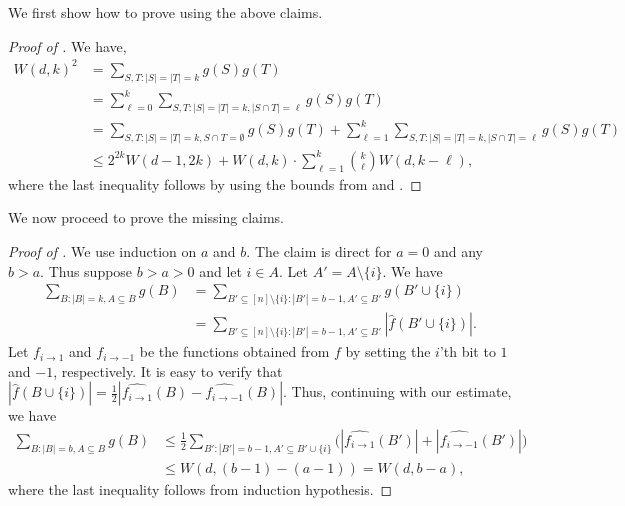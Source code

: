 \documentclass{toc}
\begin{document}
We first show how to prove  using the above claims.
\begin{proof}[Proof of ]
We have,
\begin{align*}
W(d,k)^2 &= \sum_{S,T: |S|=|T|=k} g(S) g(T) \\
 &= \sum_{\ell =0}^{k} \sum_{S, T: |S|= |T|=k, |S \cap T|=\ell} g(S) g(T) \\
 &= \sum_{S,T: |S|= |T|=k, S \cap T = \emptyset} g(S) g(T) + \sum_{\ell =1}^{k} \sum_{S, T: |S|= |T|=k, |S \cap T|=\ell} g(S) g(T) \\
 &\le 2^{2k}W(d-1,2k) + W(d,k) \cdot \sum_{\ell=1}^{k} \binom{k}{\ell}  W(d, k -\ell),
\end{align*} where the last inequality follows by using the bounds from  and .
\end{proof}
We now proceed to prove the missing claims.
\begin{proof}[Proof of ] We use induction on $a$ and $b$. The claim is direct for $a =0$  and any $b > a$. Thus suppose $b>a>0$ and let $ i\in A$. Let $A' = A \setminus \{ i\}$. We have
\begin{align*}
\sum_{B:|B|=k, A \subseteq B} g(B) &=  \sum_{B' \subseteq [n] \setminus \{ i\}:|B'|=b-1, A' \subseteq B' } g(B' \cup \{ i\}) \\
& = \sum_{B' \subseteq [n] \setminus \{ i\}:|B'|=b-1, A' \subseteq B' } |\widehat{f}(B' \cup \{ i\})|.
\end{align*}
Let $f_{i\rightarrow1}$ and $f_{i\rightarrow-1}$ be the functions obtained from $f$ by setting the $i$'th bit to $1$ and $-1$, respectively. It is easy to verify that $|\widehat{f}(B \cup \{ i\})| = \frac{1}{2}|\widehat{f_{i\rightarrow1}}(B) - \widehat{f_{i\rightarrow-1}}(B)|$. Thus, continuing with our estimate, we have
\begin{align*}
\sum_{B:|B|=b, A \subseteq B} g(B)  &\le \frac{1}{2}\sum_{B':|B'|=b-1, A' \subseteq B' \cup \{ i\} } \big(|\widehat{f_{i\rightarrow1}}(B')| + |\widehat{f_{i\rightarrow-1}}(B')|\big) \\
&\le W(d,(b-1)- (a-1))=W(d,b-a),
\end{align*} where the last inequality follows from induction hypothesis.
\end{proof}
\end{document}

